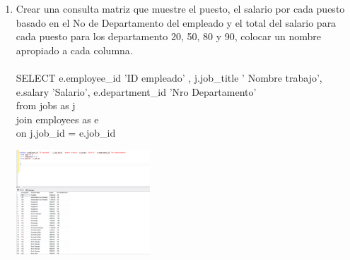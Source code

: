 \begin{enumerate}[1.]
	\item Crear una consulta matriz que muestre el puesto, el salario por cada puesto basado en el No de Departamento del empleado y el total del salario para cada puesto para los departamento 20, 50, 80 y 90, colocar un nombre apropiado a cada columna.
	\\
	\\SELECT e.employee_id 'ID empleado' , j.job_title ' Nombre trabajo', e.salary 'Salario', e.department_id 'Nro Departamento'
	\\from jobs as j
	\\join employees as e
	\\on j.job_id = e.job_id
	
	\begin{center}
	\includegraphics[width=5cm]{./Imagenes/a7a8} 
	\end{center}


\end{enumerate}

